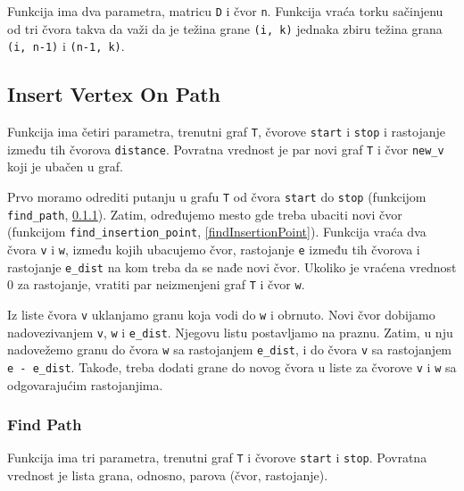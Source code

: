 Funkcija ima dva parametra, matricu \texttt{D} i čvor \texttt{n}. Funkcija vraća torku sačinjenu od tri čvora takva da važi da je težina grane \texttt{(i, k)} jednaka zbiru težina grana \texttt{(i, n-1)} i \texttt{(n-1, k)}. 




\subsection{Insert Vertex On Path}
\label{insertVertexOnPath}

Funkcija ima četiri parametra, trenutni graf \texttt{T}, čvorove \texttt{start} i \texttt{stop} i rastojanje između tih čvorova \texttt{distance}. Povratna vrednost je par novi graf \texttt{T} i čvor \texttt{new\_v} koji je ubačen u graf.

Prvo moramo odrediti putanju u grafu \texttt{T} od čvora \texttt{start} do \texttt{stop} (funkcijom \texttt{find\_path}, \ref{findPath}). Zatim, određujemo mesto gde treba ubaciti novi čvor (funkcijom \texttt{find\_insertion\_point}, \ref{findInsertionPoint}). Funkcija vraća dva čvora \texttt{v} i \texttt{w}, između kojih ubacujemo čvor, rastojanje \texttt{e} između tih čvorova i rastojanje \texttt{e\_dist} na kom treba da se nađe novi čvor. Ukoliko je vraćena vrednost 0 za rastojanje, vratiti par neizmenjeni graf \texttt{T} i čvor \texttt{w}. 

Iz liste čvora \texttt{v} uklanjamo granu koja vodi do \texttt{w} i obrnuto. Novi čvor dobijamo nadovezivanjem \texttt{v}, \texttt{w} i \texttt{e\_dist}. Njegovu listu postavljamo na praznu. Zatim, u nju nadovežemo granu do čvora \texttt{w} sa rastojanjem \texttt{e\_dist}, i do čvora \texttt{v} sa rastojanjem \texttt{e - e\_dist}. Takođe, treba dodati grane do novog čvora u liste za čvorove \texttt{v} i \texttt{w} sa odgovarajućim rastojanjima.




\subsubsection{Find Path}
\label{findPath}

Funkcija ima tri parametra, trenutni graf \texttt{T} i čvorove \texttt{start} i \texttt{stop}. Povratna vrednost je lista grana, odnosno, parova (čvor, rastojanje).


